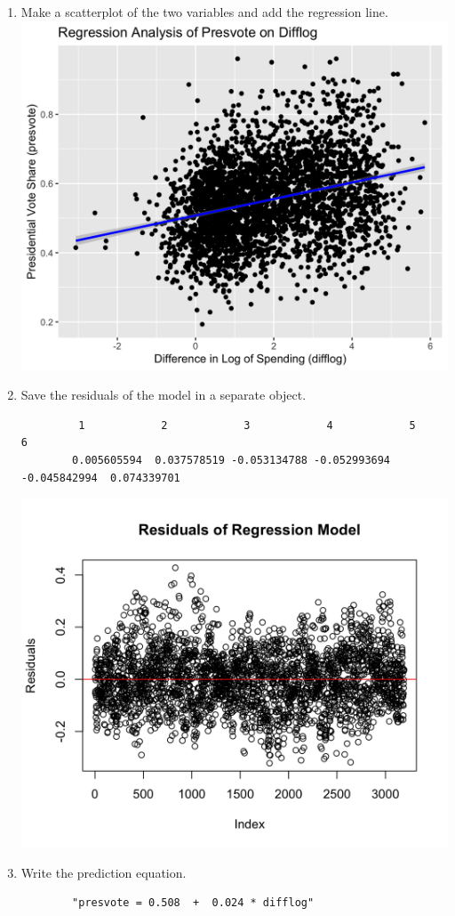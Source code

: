 \documentclass[12pt,letterpaper]{article}
\begin{document}
\begin{enumerate}
		\item Make a scatterplot of the two variables and add the regression line. 	  
			\includegraphics[width=.80\textwidth]{Scatterplot_2.2.png}
		\item Save the residuals of the model in a separate object.	
		  
		\vspace{.2cm}
		\begin{verbatim}
		 1            2            3            4            5            6 
		0.005605594  0.037578519 -0.053134788 -0.052993694 -0.045842994  0.074339701
		\end{verbatim}	
		\includegraphics[width=.80\textwidth]{Scatterplot_2.3.png}
		 
		\item Write the prediction equation.
		 
		\begin{verbatim}
		"presvote = 0.508  +  0.024 * difflog"
		 	\end{verbatim}	
	\end{enumerate}
	
\end{document}
